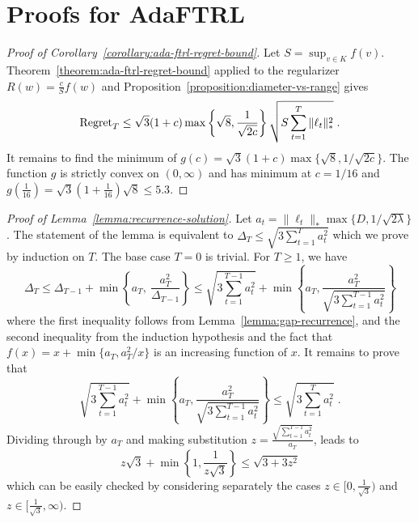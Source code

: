 \section{Proofs for AdaFTRL}
\label{section:ada-ftrl-proof}

\begin{proof}[Proof of Corollary~\ref{corollary:ada-ftrl-regret-bound}]
Let $S = \sup_{v \in K} f(v)$. Theorem~\ref{theorem:ada-ftrl-regret-bound}
applied to the regularizer $R(w) = \frac{c}{S} f(w)$ and
Proposition~\ref{proposition:diameter-vs-range} gives
$$
\operatorname{Regret}_T \le \sqrt{3}(1 + c) \max\left\{\sqrt{8}, \frac{1}{\sqrt{2c}} \right\} \sqrt{S \sum_{t=1}^T \|\ell_t\|_*^2} \; .
$$
It remains to find the minimum of $g(c) = \sqrt{3}(1 + c) \max\{\sqrt{8},
1/\sqrt{2c}\}$.  The function $g$ is strictly convex on $(0, \infty)$ and has
minimum at $c=1/16$ and $g(\frac{1}{16}) = \sqrt{3}(1+\frac{1}{16})\sqrt{8} \le
5.3$.
\end{proof}

\begin{proof}[Proof of Lemma~\ref{lemma:recurrence-solution}]
Let $a_t = \|\ell_t\|_* \max\{D, 1/\sqrt{2\lambda}\}$. The statement of the
lemma is equivalent to $\Delta_T \le \sqrt{3 \sum_{t=1}^T a_t^2}$ which we
prove by induction on $T$.  The base case $T=0$ is trivial. For $T \ge 1$, we
have
$$
\Delta_T
\le \Delta_{T-1} + \min \left\{a_T, \ \frac{a_T^2}{\Delta_{T-1}} \right\}
\le \sqrt{3 \sum_{t=1}^{T-1} a_t^2} + \min \left\{ a_T, \frac{a_T^2}{\sqrt{3 \sum_{t=1}^{T-1} a_t^2}} \right\}
$$
where the first inequality follows from Lemma~\ref{lemma:gap-recurrence}, and
the second inequality from the induction hypothesis and the fact that $f(x) = x
+ \min\{a_T, a_T^2/x\}$ is an increasing function of $x$.  It remains to prove
that
$$
\sqrt{3 \sum_{t=1}^{T-1} a_t^2} + \min \left\{ a_T, \frac{a_T^2}{\sqrt{3 \sum_{t=1}^{T-1} a_t^2}} \right\}
\le  \sqrt{3 \sum_{t=1}^T a_t^2} \; .
$$
Dividing through by $a_T$ and making substitution $z=\frac{\sqrt{\sum_{t=1}^{T-1} a_t^2}}{a_T}$, leads to
$$
z\sqrt{3} + \min\left\{1,\frac{1}{z\sqrt{3}}\right\} \le \sqrt{3 + 3z^2}
$$
which can be easily checked by considering separately the cases $z \in
[0,\frac{1}{\sqrt{3}})$ and $z \in [\frac{1}{\sqrt{3}}, \infty)$.
\end{proof}


